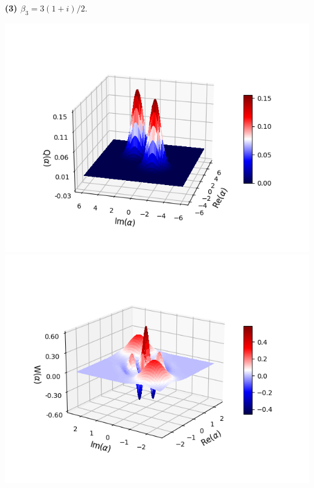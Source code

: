 \documentclass[11pt, oneside]{book}
\theoremstyle{break}
\theoremstyle{break}
\begin{document}
\textbf{(3) $\beta_3 = 3(1+i)/2$}. 
\begin{center}
\includegraphics[scale=0.8]{542HW4/b3Q}
\includegraphics[scale=0.8]{542HW4/b3W}
\end{center}
\end{document}
